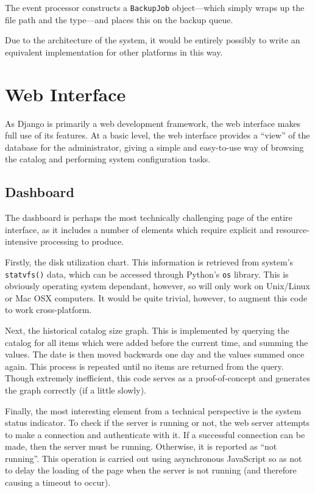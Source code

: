 The event processor constructs a \verb!BackupJob! object---which simply wraps
up the file path and the type---and places this on the backup queue.

Due to the architecture of the system, it would be entirely possibly to write
an equivalent implementation for other platforms in this way.

\section{Web Interface}
\label{sec:implementation-web}

As Django is primarily a web development framework, the web interface makes
full use of its features. At a basic level, the web interface provides
a ``view'' of the database for the administrator, giving a simple and
easy-to-use way of browsing the catalog and performing system configuration
tasks.

\subsection{Dashboard}

The dashboard is perhaps the most technically challenging page of the entire
interface, as it includes a number of elements which require explicit and
resource-intensive processing to produce.

Firstly, the disk utilization chart. This information is retrieved from
system's \verb!statvfs()! data, which can be accessed through Python's
\verb!os! library. This is obviously operating system dependant, however, so
will only work on Unix/Linux or Mac OSX computers. It would be quite trivial,
however, to augment this code to work cross-platform.

Next, the historical catalog size graph. This is implemented by querying the
catalog for all items which were added before the current time, and summing the
values. The date is then moved backwards one day and the values summed once
again. This process is repeated until no items are returned from the query.
Though extremely inefficient, this code serves as a proof-of-concept and
generates the graph correctly (if a little slowly).

Finally, the most interesting element from a technical perspective is the
system status indicator. To check if the server is running or not, the web
server attempts to make a connection and authenticate with it. If a successful
connection can be made, then the server must be running. Otherwise, it is
reported as ``not running''. This operation is carried out using asynchronous
JavaScript so as not to delay the loading of the page when the server is not
running (and therefore causing a timeout to occur).


